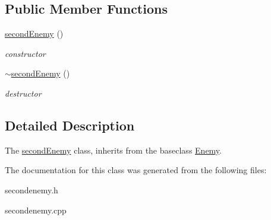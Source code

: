 \subsection*{Public Member Functions}
\begin{DoxyCompactItemize}
\item 
\mbox{\label{classsecondEnemy_a13a43a786499033936a67a31f616443c}} 
\hyperlink{classsecondEnemy_a13a43a786499033936a67a31f616443c}{second\+Enemy} ()
\begin{DoxyCompactList}\small\item\em constructor \end{DoxyCompactList}\item 
\mbox{\label{classsecondEnemy_a07f1047b76368ca83f0b4eebc33b31ba}} 
\hyperlink{classsecondEnemy_a07f1047b76368ca83f0b4eebc33b31ba}{$\sim$second\+Enemy} ()
\begin{DoxyCompactList}\small\item\em destructor \end{DoxyCompactList}\end{DoxyCompactItemize}


\subsection{Detailed Description}
The \hyperlink{classsecondEnemy}{second\+Enemy} class, inherits from the baseclass \hyperlink{classEnemy}{Enemy}. 

The documentation for this class was generated from the following files\+:\begin{DoxyCompactItemize}
\item 
secondenemy.\+h\item 
secondenemy.\+cpp\end{DoxyCompactItemize}
